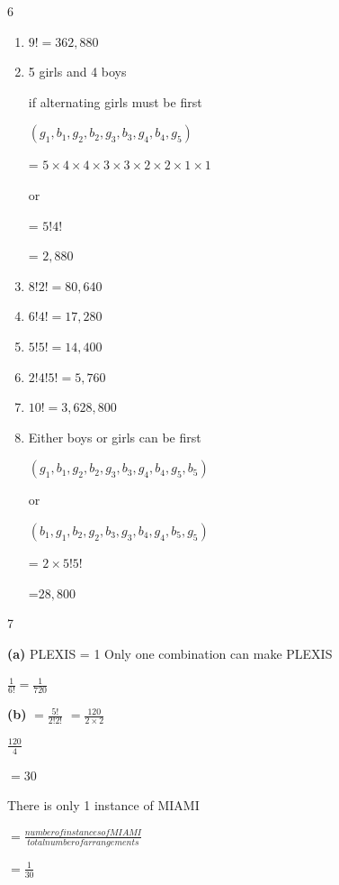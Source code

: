 \documentclass[12 pt]{article}
\begin{document}
    \begin{exercise}{6}
    \hfill
    
    \begin{enumerate}
        \item $9! = 362,880$

        \item 5 girls and 4 boys

            if alternating girls must be first

            $(g_1, b_1, g_2, b_2, g_3, b_3, g_4, b_4, g_5)$

            = $5 \times 4 \times 4 \times 3 \times 3 \times 2 \times 2 \times 1
            \times 1$

            or

            = $5!4!$

            = $2,880$

        \item $8!2! = 80,640$

        \item $6!4! = 17,280$

        \item $5!5! = 14,400$

        \item $2!4!5! = 5,760$

        \item $10! = 3,628,800$

        \item Either boys or girls can be first

        $(g_1, b_1, g_2, b_2, g_3, b_3, g_4, b_4, g_5, b_5)$

        or

        $(b_1, g_1, b_2, g_2, b_3, g_3, b_4, g_4, b_5, g_5)$

        = $2 \times 5!5!$

        =$28,800$
    \end{enumerate}
        
    \end{exercise}

    \begin{exercise}{7}
    \hfill
    
        \textbf{(a)} PLEXIS = 1
        Only one combination can make PLEXIS

        $\frac{1}{6!} = \frac{1}{720}$

        \textbf{(b)} $= \frac{5!}{2!2!}$
            $= \frac{120}{2 \times 2}$

            $\frac{120}{4}$

            $= 30$

            There is only 1 instance of MIAMI

            $= \frac{number of instances of MIAMI}{total number of arrangements}$

            $= \frac{1}{30}$

    \end{exercise}
\end{document}
